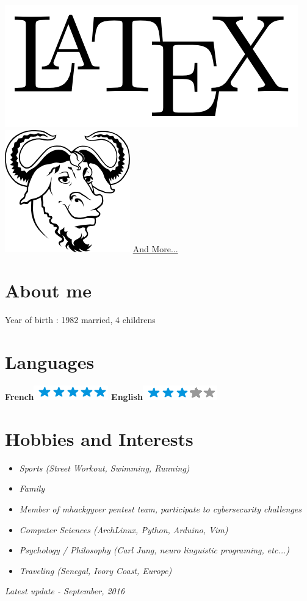 \documentclass[]{friggeri-cv}
\begin{document}
\begin{aside}
    \includegraphics[scale=0.06]{img/latex.png}
    \includegraphics[scale=0.08]{img/gnu.png}
    \href{http://www.herve-beraud.ovh/skills/}{And More...}
    ~
  \section{About me}
    Year of birth : 1982
    married, 4 childrens 
    ~
  \section{Languages}
    \textbf{French}\includegraphics[scale=0.40]{img/5stars.png}
    \textbf{English}\includegraphics[scale=0.40]{img/3stars.png}
\end{aside}

\section{Hobbies and Interests}
\begin {itemize}
    \item \emph {Sports (Street Workout, Swimming, Running)}
    \item \emph {Family}
	\item \emph {Member of mhackgyver pentest team, participate to cybersecurity challenges}
    \item \emph {Computer Sciences (ArchLinux, Python, Arduino, Vim)}
    \item \emph {Psychology / Philosophy (Carl Jung, neuro linguistic programing, etc...)}
    \item \emph {Traveling (Senegal, Ivory Coast, Europe)}
\end {itemize}
\begin{flushright}
\emph{Latest update - September, 2016}
\end{flushright}
\end{document}
